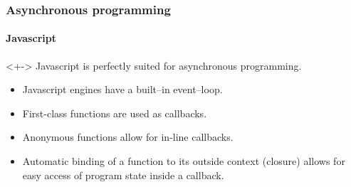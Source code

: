 \begin{frame}
	\frametitle{Asynchronous programming}
	\framesubtitle{Javascript}

	\begin{block}{}<+->
		Javascript is perfectly suited for asynchronous programming.
		\begin{itemize}[<+->]
			\item Javascript engines have a built--in event--loop.
			\item First-class functions are used as callbacks.
			\item Anonymous functions allow for in-line callbacks.
			\item Automatic binding of a function to its outside context (closure) allows for easy access of program state inside a callback.
		\end{itemize}
	\end{block}
\end{frame}


